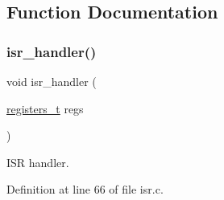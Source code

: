 \subsection{Function Documentation}
\mbox{\label{a00092_a700e3ca056bf69296370f504f2cb6cc8_a700e3ca056bf69296370f504f2cb6cc8}} 
\subsubsection{\texorpdfstring{isr\+\_\+handler()}{isr\_handler()}}
{\footnotesize\ttfamily void isr\+\_\+handler (\begin{DoxyParamCaption}\item[{\hyperlink{a00095_adf58dbaf6139b4957c348711f2026957_adf58dbaf6139b4957c348711f2026957}{registers\+\_\+t}}]{regs }\end{DoxyParamCaption})}



I\+SR handler. 



Definition at line 66 of file isr.\+c.


